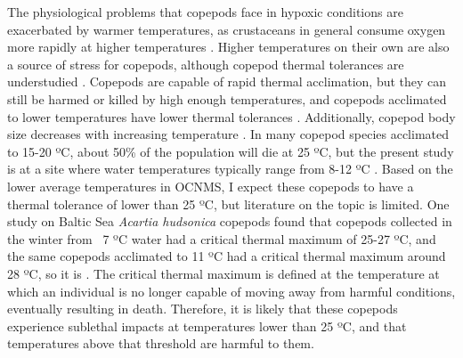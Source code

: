 \documentclass[12pt,twoside]{reedthesis}
\begin{document}
The physiological problems that copepods face in hypoxic conditions are exacerbated by warmer temperatures, as crustaceans in general consume oxygen more rapidly at higher temperatures \autocite{Vaquer-Sunyer2011}. Higher temperatures on their own are also a source of stress for copepods, although copepod thermal tolerances are understudied \autocite{Sasaki2021}. Copepods are capable of rapid thermal acclimation, but they can still be harmed or killed by high enough temperatures, and copepods acclimated to lower temperatures have lower thermal tolerances \autocite{Sasaki2021, Hahn2024}.  Additionally, copepod body size decreases with increasing temperature \autocite{Hahn2024}.  In many copepod species acclimated to 15-20 ºC, about 50\% of the population will die at 25 ºC, but the present study is at a site where water temperatures typically range from 8-12 ºC \autocite{Sasaki2019, Sunar2021, Jiang2009}. Based on the lower average temperatures in OCNMS, I expect these copepods to have a thermal tolerance of lower than 25 ºC, but literature on the topic is limited. One study on Baltic Sea \textit{Acartia hudsonica} copepods found that copepods collected in the winter from ~7 ºC water had a critical thermal maximum of 25-27 ºC, and the same copepods acclimated to 11 ºC had a critical thermal maximum around 28 ºC, so it is \autocite{Hahn2024}. The critical thermal maximum is defined at the temperature at which an individual is no longer capable of moving away from harmful conditions, eventually resulting in death. Therefore, it is likely that these copepods experience sublethal impacts at temperatures lower than 25 ºC, and that temperatures above that threshold are harmful to them. 
\end{document}
